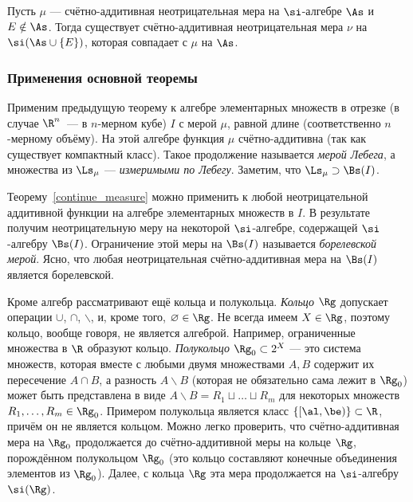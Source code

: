 \documentclass[10pt]{article}
\begin{document}
\begin{problem}
 Пусть $\mu$ --- счётно-аддитивная неотрицательная мера на
 $\si$-алгебре $\As$ и $E\notin\As$. Тогда существует
 счётно-аддитивная неотрицательная мера $\nu$ на
 $\si(\As\cup\{E\})$, которая совпадает с $\mu$ на $\As$.
\end{problem}

\subsubsection{Применения основной теоремы}

Применим предыдущую теорему к алгебре элементарных множеств в
отрезке (в случае $\R^n$~--- в $n$-мерном кубе) $I$ с мерой $\mu$,
равной длине (соответственно $n$-мерному объёму). На этой алгебре
функция $\mu$ счётно-аддитивна (так как существует компактный
класс). Такое продолжение называется \emph{мерой Лебега}, а
множества из $\Ls_{\mu}$ --- \emph{измеримыми по Лебегу}. Заметим,
что $\Ls_{\mu}\supset\Bs(I)$.

Теорему~\ref{continue_measure} можно применить к любой
неотрицательной аддитивной функции на алгебре элементарных множеств
в $I$. В результате получим неотрицательную меру на некоторой
$\si$-алгебре, содержащей $\si$-алгебру $\Bs(I)$. Ограничение этой
меры на $\Bs(I)$ называется \emph{борелевской мерой}. Ясно, что
любая неотрицательная счётно-аддитивная мера на $\Bs(I)$ является
борелевской.

\begin{note}
Кроме алгебр рассматривают ещё кольца и полукольца. \emph{Кольцо}
$\Rg$ допускает операции $\cup$, $\cap$, $\backslash$, и, кроме
того, $\varnothing\in\Rg$. Не всегда имеем $X\in\Rg$, поэтому
кольцо, вообще говоря, не является алгеброй. Например, ограниченные
множества в $\R$ образуют кольцо. \emph{Полукольцо} $\Rg_0\subset
2^X$ --- это система множеств, которая вместе с любыми двумя
множествами $A,B$ содержит их пересечение $A\cap B$, а разность
$A\backslash B$ (которая не обязательно сама лежит в $\Rg_0$) может
быть представлена в виде $A\backslash B=R_1\sqcup\ldots\sqcup R_m$
для некоторых множеств $R_1,\ldots,R_m\in\Rg_0$. Примером полукольца
является класс $\{[\al,\be)\}\subset\R$, причём он не является
кольцом. Можно легко проверить, что счётно-аддитивная мера на
$\Rg_0$ продолжается до счётно-аддитивной меры на кольце $\Rg$,
порождённом полукольцом $\Rg_0$ (это кольцо составляют конечные
объединения элементов из $\Rg_0$). Далее, с кольца $\Rg$ эта мера
продолжается на $\si$-алгебру $\si(\Rg)$.
\end{note}
\end{document}
